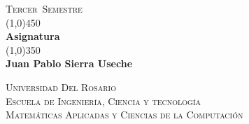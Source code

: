 \documentclass[a4paper]{book}
\newcommand{\titPag}{
    \begin{titlepage}
        \begin{flushright}
            \textsc{\large {\semestre\ Semestre}}\\
            \line(1,0){450} \\
            [0.635cm]
            \huge{\bfseries \asignatura} \\
            [0.2cm]
            \line(1,0){350} \\
            \LARGE{\bfseries \autor} \\
            [16.25cm]
        \end{flushright}
        \begin{flushright}
        \textsc{
            \universidad \\
            [0.1cm]
            \escuela \\
            [0.1cm]
            \carrera
        }
        \end{flushright}
    \end{titlepage}
}
\newcommand{\asignatura}{Asignatura}
\newcommand{\autor}{Juan Pablo Sierra Useche}
\newcommand{\semestre}{Tercer}
\newcommand{\universidad}{Universidad Del Rosario}
\newcommand{\escuela}{Escuela de Ingeniería, Ciencia y tecnología}
\newcommand{\carrera}{Matemáticas Aplicadas y Ciencias de la Computación}
\begin{document}
    \titPag
    \tableofcontents







    \printbibliography
\end{document}
